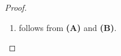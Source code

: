 \begin{proof}
\begin{enumerate}[label=\textbf{(\Alph*)}]
\begin{itemize}
\[\begin{array}{c}
                \Downarrow \\
                n - 1 \geq m \\
                \Downarrow \\
                n \geq m + 1 \\
                \Downarrow \\
                Q(m + 1) \text{ is true}
            \end{array}
            \]
        \end{itemize}
        By the \emph{principle of mathematical induction}, $Q(m)$ is true for all $m \in \N_{0}$.
        \item follows from \textbf{(A)} and \textbf{(B)}.
    \end{enumerate}
\end{proof}

